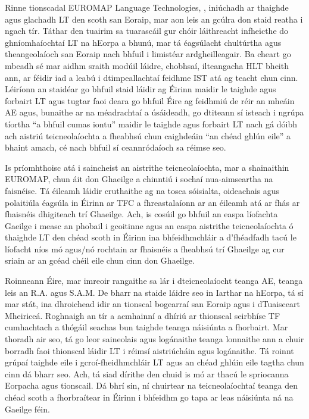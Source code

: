 \documentclass[]{../../metanetpaper}
\begin{document}
\begin{multicols}{2}
Rinne tionscadal EUROMAP Language Technologies, \cite{euromap}, iniúchadh ar thaighde agus glachadh LT den scoth san Eoraip, mar aon leis an gcúlra don staid reatha i ngach tír. Táthar den tuairim sa tuarascáil gur chóir láithreacht infheicthe do ghníomhaíochtaí LT na hEorpa a bhunú, mar tá éagsúlacht chultúrtha agus theangeolaíoch san Eoraip nach bhfuil i limistéar ardgheilleagair. Ba cheart go mbeadh sé mar aidhm sraith modúil láidre, chobhsaí, ilteangacha HLT bheith ann, ar féidir iad a leabú i dtimpeallachtaí feidhme IST atá ag teacht chun cinn. Léiríonn an staidéar go bhfuil staid láidir ag Éirinn maidir le taighde agus forbairt LT agus tugtar faoi deara go bhfuil Éire ag feidhmiú de réir an mheáin AE agus, bunaithe ar na méadrachtaí a úsáideadh, go dtiteann sí isteach i ngrúpa tíortha ``a bhfuil cumas iontu'' maidir le taighde agus forbairt LT nach gá dóibh ach aistriú teicneolaíochta a fheabhsú chun caighdeáin ``an chéad ghlún eile'' a bhaint amach, cé nach bhfuil sí ceannródaíoch sa réimse seo.



Is príomhthoisc atá i saincheist an aistrithe teicneolaíochta, mar a shainaithin EUROMAP, chun áit don Ghaeilge a chinntiú i sochaí nua-aimseartha na faisnéise.  Tá éileamh láidir cruthaithe ag na tosca sóisialta, oideachais agus polaitiúla éagsúla in Éirinn ar TFC a fhreastalaíonn ar an éileamh atá ar fhás ar fhaisnéis dhigiteach trí Ghaeilge. Ach, is cosúil go bhfuil an easpa líofachta Gaeilge i measc an phobail i gcoitinne agus an easpa aistrithe teicneolaíochta ó thaighde LT den chéad scoth in Éirinn ina bhfeidhmchláir a d'fhéadfadh tacú le líofacht níos mó agus/nó rochtain ar fhaisnéis a fheabhsú trí Ghaeilge ag cur sriain ar an gcéad chéil eile chun cinn don Ghaeilge.

Roinneann Éire, mar imreoir rangaithe sa lár i dteicneolaíocht teanga AE, teanga leis an R.A. agus S.A.M. De bharr na staide láidre seo in Iarthar na hEorpa, tá sí mar stát, ina dhroichead idir an tionscal bogearraí san Eoraip agus i dTuaisceart Mheiriceá. Roghnaigh an tír a acmhainní a dhíriú ar thionscal seirbhíse TF cumhachtach a thógáil seachas bun taighde teanga náisiúnta a fhorbairt. Mar thoradh air seo, tá go leor saineolais agus logánaithe teanga lonnaithe ann a chuir borradh faoi thionscal láidir LT i réimsí aistriúcháin agus logánaithe. Tá roinnt grúpaí taighde eile i gcroí-fheidhmchláir LT agus an chéad ghlúin eile tagtha chun cinn dá bharr seo. Ach, tá siad dírithe den chuid is mó ar thacú le spriocanna Eorpacha agus tionscail. Dá bhrí sin, ní chuirtear na teicneolaíochtaí teanga den chéad scoth a fhorbraítear in Éirinn i bhfeidhm go tapa ar leas náisiúnta ná na Gaeilge féin.


\end{multicols}
\end{document}
